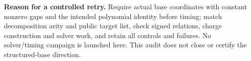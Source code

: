 \documentclass[10pt]{article}
\begin{document}
\textbf{Reason for a controlled retry.} Require actual base coordinates
with constant nonzero gaps and the intended polynomial identity before
timing; match decomposition arity and public target list, check signed
relations, charge construction and solver work, and retain all controls and
failures. No solver/timing campaign is launched here. This audit does not
close or certify the structured-base direction.
\end{document}
